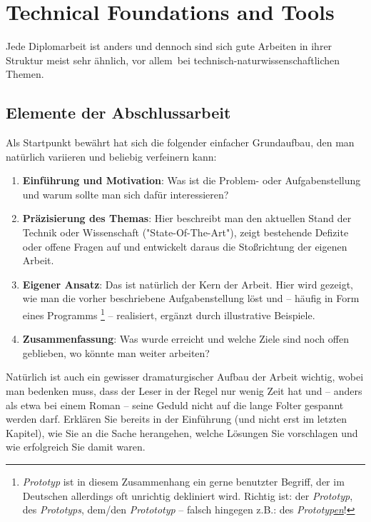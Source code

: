 \chapter{Technical Foundations and Tools}
\label{cha:Diplomschrift}

Jede Diplomarbeit ist anders und dennoch sind sich gute
Arbeiten in ihrer Struktur meist sehr ähnlich, vor allem\ bei
technisch-natur\-wissen\-schaft\-lichen Themen. 

\section{Elemente der Abschlussarbeit}

Als Startpunkt bewährt hat sich die folgender
einfacher Grundaufbau, den man natürlich vari\-ieren und beliebig
verfeinern kann:
%
\begin{enumerate}
\item \textbf{Einführung und Motivation}: Was ist die Problem- oder Aufgabenstellung und
warum sollte man sich dafür interessieren?
\item \textbf{Präzisierung des Themas}: Hier beschreibt man den aktuellen Stand der Technik
oder Wissenschaft ("State-Of-The-Art"), zeigt bestehende
Defizite oder offene Fragen auf und entwickelt daraus die
Stoßrichtung der eigenen Arbeit.
\item \textbf{Eigener Ansatz}: Das ist natürlich der Kern der Arbeit. Hier
wird gezeigt, wie man die vorher beschriebene Aufgabenstellung löst und --
häufig in Form eines Programms%
\footnote{\emph{Prototyp} ist in diesem Zusammenhang ein gerne benutzter Begriff, der im Deutschen
allerdings oft unrichtig dekliniert wird. Richtig ist: der \emph{Prototyp}, des \emph{Prototyps}, dem/den \emph{Protototyp} -- falsch hingegen z.B.: des \emph{Prototyp\underline{en}}!
} --
realisiert, ergänzt durch illustrative Beispiele.
\item \textbf{Zusammenfassung}: Was wurde erreicht und welche Ziele sind
noch offen geblieben, wo könnte man weiter arbeiten?
\end{enumerate}
%
Natürlich ist auch ein gewisser dramaturgischer Aufbau der Arbeit
wichtig, wobei man bedenken muss, dass der Leser in der Regel nur
wenig Zeit hat und -- anders als etwa bei einem Roman -- seine
Geduld nicht auf die lange Folter gespannt werden darf. Erklären
Sie bereits in der Einführung (und nicht erst im letzten Kapitel),
wie Sie an die Sache herangehen, welche Lösungen Sie vorschlagen
und wie erfolgreich Sie damit waren.

